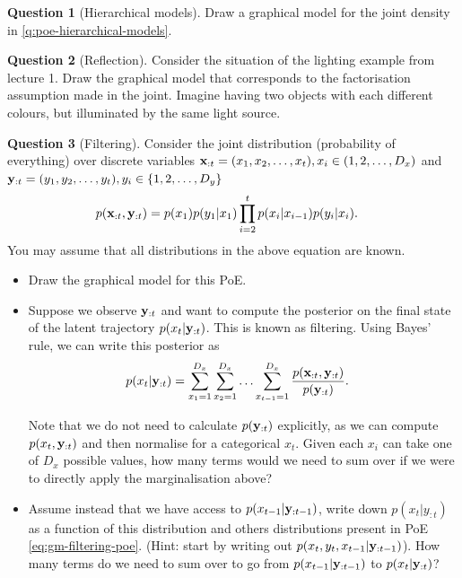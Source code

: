 \documentclass[a4paper]{article}
\theoremstyle{definition}
\newtheorem{question}{Question}
\begin{document}
\begin{question}[Hierarchical models]
\label{q:gm-hierarchical-models}
Draw a graphical model for the joint density in \cref{q:poe-hierarchical-models}.
\end{question}

\begin{question}[Reflection]
\label{q:gm-reflection}
Consider the situation of the lighting example from lecture 1. Draw the graphical model that corresponds to the factorisation assumption made in the joint. Imagine having two objects with each different colours, but illuminated by the same light source.
\end{question}


\begin{question}[Filtering]
\label{q:gm-filtering}
Consider the joint distribution (probability of everything) over discrete variables $\mathbf{x}_{:t}=(x_1,x_2,\ldots,x_t), x_i\in(1,2,\ldots,D_x)$ and $\mathbf{y}_{:t}=(y_1,y_2,\ldots,y_t), y_i\in\{1,2,\ldots,D_y\}$
\begin{align}
p( \mathbf{x}_{:t}, \mathbf{y}_{:t} ) &= p( x_1 ) p( y_1 | x_1 ) \prod_{i=2}^t p( x_i | x_{i-1}) p( y_i | x_i ). \label{eq:gm-filtering-poe}
\end{align}
You may assume that all distributions in the above equation are known. 

\begin{itemize}
\item Draw the graphical model for this PoE.
\item Suppose we observe $\mathbf{y}_{:t}$ and want to compute the posterior on the final state of the latent trajectory $p( x_t | \mathbf{y}_{:t} )$. This is known as filtering. Using Bayes' rule, we can write this posterior as
\begin{align}
p( x_t | \mathbf{y}_{:t} ) &= \sum_{x_1=1}^{D_x} \sum_{x_2=1}^{D_x} \ldots \sum_{x_{t-1}=1}^{D_x} \frac{ p( \mathbf{x}_{:t}, \mathbf{y}_{:t} ) }{ p( \mathbf{y}_{:t} ) }. \label{eq:graphical-models-naive-filter}
\end{align} 

Note that we do not need to calculate $p( \mathbf{y}_{:t} )$ explicitly, as we can compute $p( x_t, \mathbf{y}_{:t} )$ and then normalise for a categorical $x_t$. Given each $x_i$ can take one of $D_x$ possible values, how many terms would we need to sum over if we were to directly apply the marginalisation above?

\item Assume instead that we have access to $p( x_{t-1} | \mathbf{y}_{:t-1} )$, write down $p(x_t | y_{:t})$ as a function of this distribution and others distributions present in PoE \eqref{eq:gm-filtering-poe}. (Hint: start by writing out $p(x_t, y_t, x_{t-1} | \mathbf{y}_{:t-1})$). How many terms do we need to sum over to go from $p( x_{t-1} | \mathbf{y}_{:t-1} )$ to $p( x_{t} | \mathbf{y}_{:t} )$?


\end{itemize}
\end{question}
\end{document}
